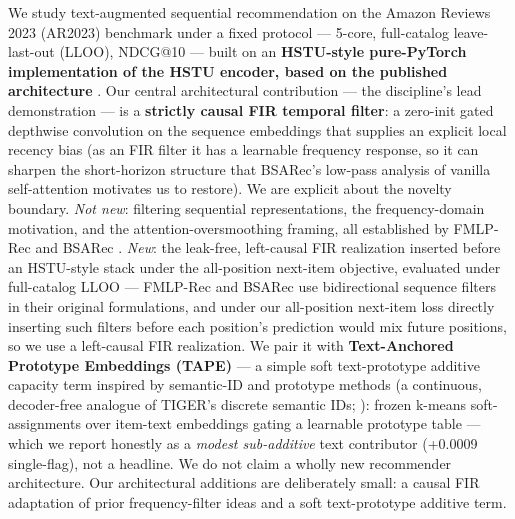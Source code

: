 We study text-augmented sequential recommendation on the Amazon Reviews 2023 (AR2023) benchmark \citep{hou2024blair} under a fixed protocol --- 5-core, full-catalog leave-last-out (LLOO), NDCG@10 --- built on an \textbf{HSTU-style pure-PyTorch implementation of the HSTU encoder, based on the published architecture} \citep{zhai2024hstu}. Our central architectural contribution --- the discipline's lead demonstration --- is a \textbf{strictly causal FIR temporal filter}: a zero-init gated depthwise convolution on the sequence embeddings that supplies an explicit local recency bias (as an FIR filter it has a learnable frequency response, so it can sharpen the short-horizon structure that BSARec's low-pass analysis of vanilla self-attention motivates us to restore). We are explicit about the novelty boundary. \emph{Not new}: filtering sequential representations, the frequency-domain motivation, and the attention-oversmoothing framing, all established by FMLP-Rec \citep{zhou2022fmlprec} and BSARec \citep{shin2024bsarec}. \emph{New}: the leak-free, left-causal FIR realization inserted before an HSTU-style stack under the all-position next-item objective, evaluated under full-catalog LLOO --- FMLP-Rec and BSARec use bidirectional sequence filters in their original formulations, and under our all-position next-item loss directly inserting such filters before each position's prediction would mix future positions, so we use a left-causal FIR realization. We pair it with \textbf{Text-Anchored Prototype Embeddings (TAPE)} --- a simple soft text-prototype additive capacity term inspired by semantic-ID and prototype methods (a continuous, decoder-free analogue of TIGER's discrete semantic IDs; \citealp{rajput2023tiger}): frozen k-means soft-assignments over item-text embeddings gating a learnable prototype table --- which we report honestly as a \emph{modest sub-additive} text contributor (+0.0009 single-flag), not a headline. We do not claim a wholly new recommender architecture. Our architectural additions are deliberately small: a causal FIR adaptation of prior frequency-filter ideas and a soft text-prototype additive term.

